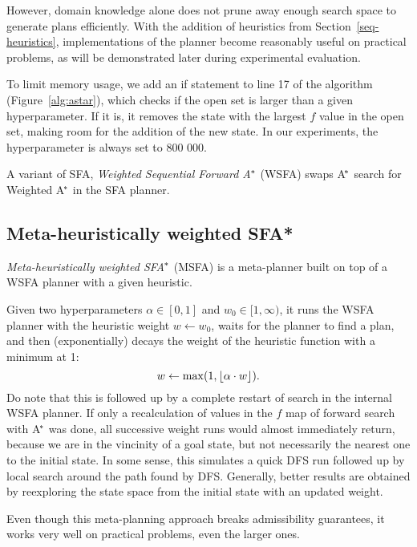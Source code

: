 However, domain knowledge alone does not
prune away enough search space to
generate plans efficiently.
With the addition of
heuristics
from Section~\ref{seq-heuristics},
implementations of the planner become reasonably useful
on practical problems, as will be demonstrated
later during experimental evaluation.

To limit memory usage, we add an if statement to line 17 of the algorithm
(Figure~\ref{alg:astar}),
which checks if the open set is larger than a given hyperparameter.
If it is, it removes the state with the largest $f$ value in the open set,
making room for the addition of the new state. In our experiments,
the hyperparameter is always set to 800 000.

A variant of SFA,
\textit{Weighted Sequential Forward A$^{\kern-.05em*}$} (WSFA)
swaps A$^{\kern-.15em*}$ search for Weighted A$^{\kern-.15em*}$ in the SFA planner.

\subsection{Meta-heuristically weighted SFA*}\label{msfa}

\textit{Meta-heuristically weighted SFA$^{\kern-.05em*}$} (MSFA) is
a meta-planner built on top of a WSFA planner with
a given heuristic.

Given two hyperparameters $\alpha \in [0, 1]$ and $w_0 \in [1, \infty)$,
it runs the WSFA planner with the heuristic weight $w \gets w_0$,
waits for the planner to find a plan,
and then (exponentially) decays the
weight of the heuristic function
with a minimum at 1:
$$w \gets \max(1, \floor*{\alpha \cdot w}).$$
Do note that this is followed up by a complete restart of search in the internal WSFA planner.
If only a recalculation of values in the $f$ map
of forward search with A$^{\kern-.15em*}$ was done, all successive
weight runs would almost immediately return, because we are in the vincinity of a goal state,
but not necessarily the nearest one to the initial state.
In some sense, this simulates a quick DFS run followed up
by local search around the path found by DFS.
Generally, better results are obtained by reexploring the
state space from the initial state with an updated weight.

Even though this meta-planning approach breaks
admissibility guarantees, it works very well on
practical problems, even the larger ones.



















